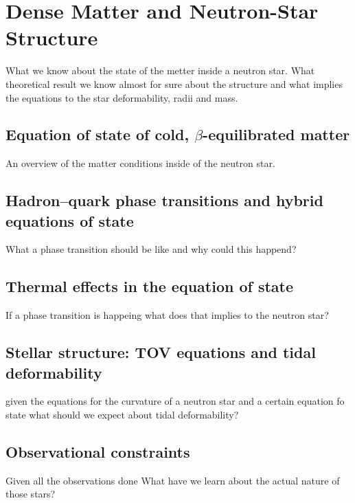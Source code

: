 \chapter{Dense Matter and Neutron-Star Structure}\label{ch:mergers}
What we know about the state of the metter inside a neutron star. What theoretical result we know almost for sure about the structure and what implies the equations to the star deformability, radii and mass.
\section[Equation of state of cold, beta-equilibrated matter]{Equation of state of cold, $\beta$-equilibrated matter}
An overview of the matter conditions inside of the neutron star.
\section[Hadron–quark phase transitions and hybrid equations of state]{Hadron–quark phase transitions and hybrid equations of state}
What a phase transition should be like and why could this happend?
\section[Thermal effects in the equation of state]{Thermal effects in the equation of state}
If a phase transition is happeing what does that implies to the neutron star?
\section[Stellar structure: TOV equations and tidal deformability]{Stellar structure: TOV equations and tidal deformability}
given the equations for the curvature of a neutron star and a certain equation fo state what should we expect about tidal deformability?
\section[Observational constraints]{Observational constraints}
Given all the observations done What have we learn about the actual nature of those stars?

